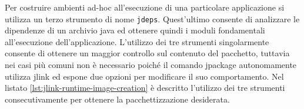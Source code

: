 	Per costruire ambienti ad-hoc all'esecuzione di una particolare applicazione si utilizza un terzo strumento di nome \texttt{jdeps}. Quest'ultimo consente di analizzare le dipendenze di un archivio java ed ottenere quindi i moduli fondamentali all'esecuzione dell'applicazione. L'utilizzo dei tre strumenti singolarmente consente di ottenere un maggior controllo sul contenuto del pacchetto, tuttavia nei casi più comuni non è necessario poiché il comando jpackage autonomamente utilizza jlink ed espone due opzioni per modificare il suo comportamento. Nel listato \ref{lst:jlink-runtime-image-creation} è descritto l'utilizzo dei tre strumenti consecutivamente per ottenere la pacchettizzazione desiderata.



